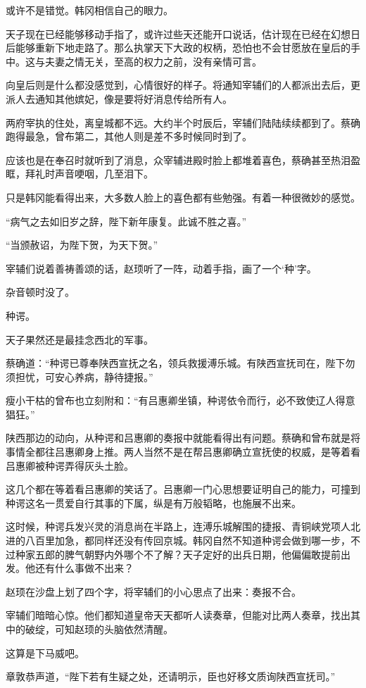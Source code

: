 或许不是错觉。韩冈相信自己的眼力。

天子现在已经能够移动手指了，或许过些天还能开口说话，估计现在已经在幻想日后能够重新下地走路了。那么执掌天下大政的权柄，恐怕也不会甘愿放在皇后的手中。这与夫妻之情无关，至高的权力之前，没有亲情可言。

向皇后则是什么都没感觉到，心情很好的样子。将通知宰辅们的人都派出去后，更派人去通知其他嫔妃，像是要将好消息传给所有人。

两府宰执的住处，离皇城都不远。大约半个时辰后，宰辅们陆陆续续都到了。蔡确跑得最急，曾布第二，其他人则是差不多时候同时到了。

应该也是在奉召时就听到了消息，众宰辅进殿时脸上都堆着喜色，蔡确甚至热泪盈眶，拜礼时声音哽咽，几至泪下。

只是韩冈能看得出来，大多数人脸上的喜色都有些勉强。有着一种很微妙的感觉。

“病气之去如旧岁之辞，陛下新年康复。此诚不胜之喜。”

“当颁赦诏，为陛下贺，为天下贺。”

宰辅们说着善祷善颂的话，赵顼听了一阵，动着手指，画了一个‘种’字。

杂音顿时没了。

种谔。

天子果然还是最挂念西北的军事。

蔡确道：“种谔已尊奉陕西宣抚之名，领兵救援溥乐城。有陕西宣抚司在，陛下勿须担忧，可安心养病，静待捷报。”

瘦小干枯的曾布也立刻附和：“有吕惠卿坐镇，种谔依令而行，必不致使辽人得意猖狂。”

陕西那边的动向，从种谔和吕惠卿的奏报中就能看得出有问题。蔡确和曾布就是将事情全都往吕惠卿身上推。两人当然不是在帮吕惠卿确立宣抚使的权威，是等着看吕惠卿被种谔弄得灰头土脸。

这几个都在等着看吕惠卿的笑话了。吕惠卿一门心思想要证明自己的能力，可撞到种谔这名一贯爱自行其事的下属，纵是有万般韬略，也施展不出来。

这时候，种谔兵发兴灵的消息尚在半路上，连溥乐城解围的捷报、青铜峡党项人北进的八百里加急，都同样还没有传回京城。韩冈自然不知道种谔会做到哪一步，不过种家五郎的脾气朝野内外哪个不了解？天子定好的出兵日期，他偏偏敢提前出发。他还有什么事做不出来？

赵顼在沙盘上划了四个字，将宰辅们的小心思点了出来：奏报不合。

宰辅们暗暗心惊。他们都知道皇帝天天都听人读奏章，但能对比两人奏章，找出其中的破绽，可知赵顼的头脑依然清醒。

这算是下马威吧。

章敦恭声道，“陛下若有生疑之处，还请明示，臣也好移文质询陕西宣抚司。”

